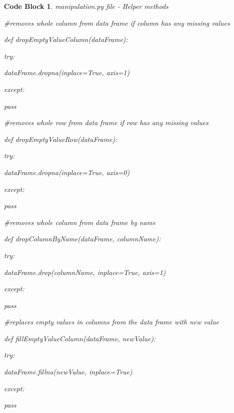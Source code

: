 \documentclass[12pt, a4paper, oneside]{book}
\newtheorem{codeblock}[theorem]{Code Block}
\numberwithin{equation}{section}
\begin{document}
\begin{codeblock}
  manipulation.py file - Helper methods

  \#removes whole column from data frame if column has any missing values

  def dropEmptyValueColumn(dataFrame):
  
  \hspace{\parindent}try:
  
  \hspace{\parindent}\hspace{\parindent}dataFrame.dropna(inplace=True, axis=1)
  
  \hspace{\parindent}except:
  
  \hspace{\parindent}\hspace{\parindent}pass

  \#removes whole row from data frame if row has any missing values
  
  def dropEmptyValueRow(dataFrame):
  
  \hspace{\parindent}try:
  
  \hspace{\parindent}\hspace{\parindent}dataFrame.dropna(inplace=True, axis=0)
  
  \hspace{\parindent}except:
  
  \hspace{\parindent}\hspace{\parindent}pass

  \#removes whole column from data frame by name
  
  def dropColumnByName(dataFrame, columnName):
  
  \hspace{\parindent}try:
  
  \hspace{\parindent}\hspace{\parindent}dataFrame.drop(columnName, inplace=True, axis=1)
  
  \hspace{\parindent}except:
  
  \hspace{\parindent}\hspace{\parindent}pass

  \#replaces empty values in columns from the data frame with new value
  
  def fillEmptyValueColumn(dataFrame, newValue):
  
  \hspace{\parindent}try:
  
  \hspace{\parindent}\hspace{\parindent}dataFrame.fillna(newValue, inplace=True)
  
  \hspace{\parindent}except:
  
  \hspace{\parindent}\hspace{\parindent}pass
\end{codeblock}
\end{document}
